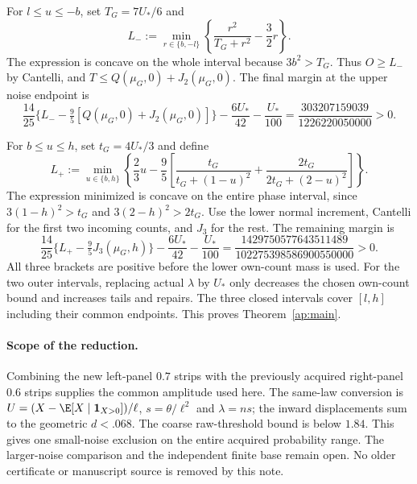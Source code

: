 For $l\le u\le-b$, set $T_G=7U_*/6$ and
\[
 L_-:=\min_{r\in\{b,-l\}}
              \left\{\frac{r^2}{T_G+r^2}-\frac32r\right\}.
\]
The expression is concave on the whole interval because $3b^2>T_G$.
Thus $O\ge L_-$ by Cantelli, and $T\le Q(\mu_G,0)+J_2(\mu_G,0)$.
The final margin at the upper noise endpoint is
\[
 \frac{14}{25}\{L_--\tfrac95[Q(\mu_G,0)+J_2(\mu_G,0)]\}
       -\frac{6U_*}{42}-\frac{U_*}{100}
                    =\frac{303207159039}{1226220050000}>0.
\]

For $b\le u\le h$, set $t_G=4U_*/3$ and define
\[
 L_+:=\min_{u\in\{b,h\}}
  \left\{\frac23u-\frac95\left[
    \frac{t_G}{t_G+(1-u)^2}+\frac{2t_G}{2t_G+(2-u)^2}\right]\right\}.
\]
The expression minimized is concave on the entire phase interval, since
$3(1-h)^2>t_G$ and $3(2-h)^2>2t_G$. Use the lower normal increment,
Cantelli for the first two incoming counts, and $J_3$ for the rest. The
remaining margin is
\[
 \frac{14}{25}\{L_+-\tfrac95J_3(\mu_G,h)\}
       -\frac{6U_*}{42}-\frac{U_*}{100}
          =\frac{1429750577643511489}{102275398586900550000}>0.
\]
All three brackets are positive before the lower own-count mass is used.
For the two outer intervals, replacing actual $\lambda$ by $U_*$ only
decreases the chosen own-count bound and increases tails and repairs.
The three closed intervals cover $[l,h]$ including their common endpoints.
This proves Theorem~\ref{ap:main}.

\paragraph{Scope of the reduction.}
Combining the new left-panel $0.7$ strips with the previously acquired
right-panel $0.6$ strips supplies the common amplitude used here. The
same-law conversion is $U=(X-\E[X\mid\mathbf1_{X>0}])/\ell$,
$s=\theta/\ell^2$ and $\lambda=ns$; the inward displacements sum to
the geometric $d<.068$. The coarse raw-threshold bound is below $1.84$.
This gives one small-noise exclusion on the entire acquired probability
range. The larger-noise comparison and the independent finite base remain
open. No older certificate or manuscript source is removed by this note.
